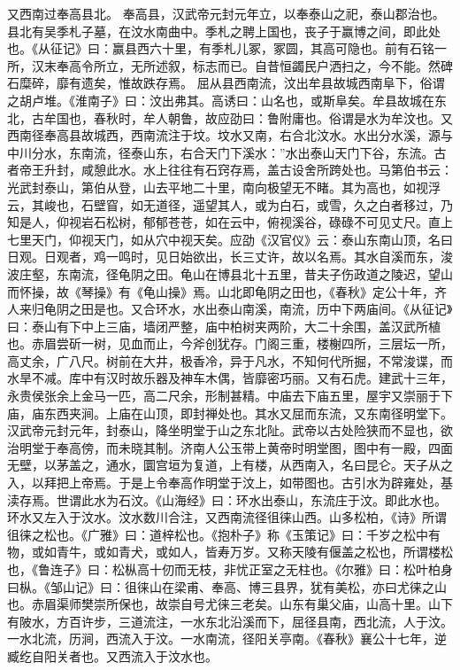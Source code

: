 \documentclass[12pt,UTF8]{ctexbook}
\begin{document}
又西南过奉高县北。
奉高县，汉武帝元封元年立，以奉泰山之祀，泰山郡治也。县北有吴季札子墓，在汶水南曲中。季札之聘上国也，丧子于赢博之间，即此处也。《从征记》曰：赢县西六十里，有季札儿冢，冢圆，其高可隐也。前有石铭一所，汉末奉高令所立，无所述叙，标志而已。自昔恒蠲民户洒扫之，今不能。然碑石糜碎，靡有遗矣，惟故跌存焉。
屈从县西南流，汶出牟县故城西南阜下，俗谓之胡卢堆。《淮南子》曰：汶出弗其。高诱曰：山名也，或斯阜矣。牟县故城在东北，古牟国也，春秋时，牟人朝鲁，故应劭曰：鲁附庸也。俗谓是水为牟汶也。又西南径奉高县故城西，西南流注于坟。坟水又南，右合北汶水。水出分水溪，源与中川分水，东南流，径泰山东，右合天门下溪水：”水出泰山天门下谷，东流。古者帝王升封，咸憩此水。水上往往有石窍存焉，盖古设舍所跨处也。马第伯书云：光武封泰山，第伯从登，山去平地二十里，南向极望无不睹。其为高也，如视浮云，其峻也，石壁窅，如无道径，遥望其人，或为白石，或雪，久之白者移过，乃知是人，仰视岩石松树，郁郁苍苍，如在云中，俯视溪谷，碌碌不可见丈尺。直上七里天门，仰视天门，如从穴中视天矣。应劭《汉官仪》云：泰山东南山顶，名曰日观。日观者，鸡一鸣时，见日始欲出，长三丈许，故以名焉。其水自溪而东，浚波庄壑，东南流，径龟阴之田。龟山在博县北十五里，昔夫子伤政道之陵迟，望山而怀操，故《琴操》有《龟山操》焉。山北即龟阴之田也，《春秋》定公十年，齐人来归龟阴之田是也。又合环水，水出泰山南溪，南流，历中下两庙间。《从征记》曰：泰山有下中上三庙，墙闭严整，庙中柏树夹两阶，大二十余围，盖汉武所植也。赤眉尝斫一树，见血而止，今斧创犹存。门阁三重，楼榭四所，三层坛一所，高丈余，广八尺。树前在大井，极香冷，异于凡水，不知何代所掘，不常浚谍，而水旱不减。库中有汉时故乐器及神车木偶，皆靡密巧丽。又有石虎。建武十三年，永贵侯张余上金马一匹，高二尺余，形制甚精。中庙去下庙五里，屋宇又崇丽于下庙，庙东西夹涧。上庙在山顶，即封禅处也。其水又屈而东流，又东南径明堂下。汉武帝元封元年，封泰山，降坐明堂于山之东北阯。武帝以古处险狭而不显也，欲治明堂于奉高傍，而未晓其制。济南人公玉带上黄帝时明堂图，图中有一殿，四面无壁，以茅盖之，通水，圜宫垣为复道，上有楼，从西南入，名曰昆仑。天子从之入，以拜把上帝焉。于是上令奉高作明堂于汶上，如带图也。古引水为辟雍处，基渎存焉。世谓此水为石汶。《山海经》曰：环水出泰山，东流庄于汶。即此水也。环水又左入于汶水。汶水数川合注，又西南流径徂徕山西。山多松柏，《诗》所谓徂徕之松也。《广雅》曰：道梓松也。《抱朴子》称《玉策记》曰：千岁之松中有物，或如青牛，或如青犬，或如人，皆寿万岁。又称天陵有偃盖之松也，所谓楼松也，《鲁连子》曰：松枞高十仞而无枝，非忧正室之无柱也。《尔雅》曰：松叶柏身曰枞。《邹山记》曰：徂徕山在梁甫、奉高、博三县界，犹有美松，亦曰尤徕之山也。赤眉渠师樊崇所保也，故崇自号尤徕三老矣。山东有巢父庙，山高十里。山下有陂水，方百许步，三道流注，一水东北沿溪而下，屈径县南，西北流，人于汶。一水北流，历涧，西流入于汶。一水南流，径阳关亭南。《春秋》襄公十七年，逆臧纥自阳关者也。又西流入于汶水也。
\end{document}
